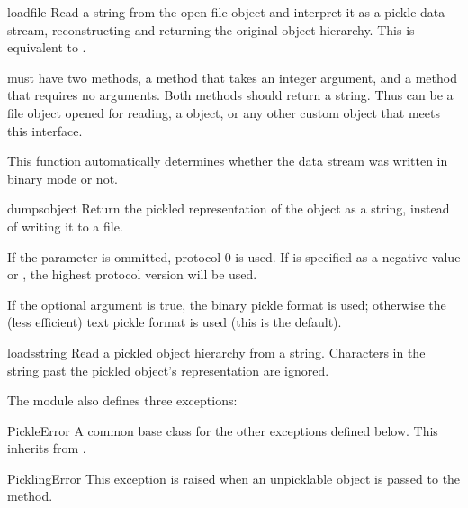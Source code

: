 \begin{funcdesc}{load}{file}
Read a string from the open file object  and interpret it as
a pickle data stream, reconstructing and returning the original object
hierarchy.  This is equivalent to .

 must have two methods, a  method that takes
an integer argument, and a  method that requires no
arguments.  Both methods should return a string.  Thus  can
be a file object opened for reading, a
 object, or any other custom
object that meets this interface.

This function automatically determines whether the data stream was
written in binary mode or not.
\end{funcdesc}

\begin{funcdesc}{dumps}{object}
Return the pickled representation of the object as a string, instead
of writing it to a file.

If the  parameter is ommitted, protocol 0 is used.
If  is specified as a negative value
or ,
the highest protocol version will be used.


If the optional  argument is
true, the binary pickle format is used; otherwise the (less efficient)
text pickle format is used (this is the default).
\end{funcdesc}

\begin{funcdesc}{loads}{string}
Read a pickled object hierarchy from a string.  Characters in the
string past the pickled object's representation are ignored.
\end{funcdesc}

The  module also defines three exceptions:

\begin{excdesc}{PickleError}
A common base class for the other exceptions defined below.  This
inherits from .
\end{excdesc}

\begin{excdesc}{PicklingError}
This exception is raised when an unpicklable object is passed to
the  method.
\end{excdesc}

